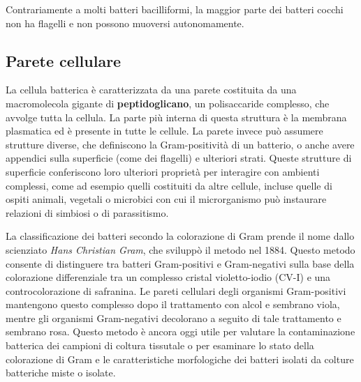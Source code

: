 \documentclass[../main.tex]{subfiles}
\begin{document}
Contrariamente a molti batteri bacilliformi, la maggior parte dei batteri cocchi non ha flagelli e non possono muoversi autonomamente.\cite{levinson_2018}

\subsection{Parete cellulare}

La cellula batterica è caratterizzata da una parete costituita da una macromolecola gigante di \textbf{peptidoglicano}, un polisaccaride complesso, che avvolge tutta la cellula. La parte più interna di questa struttura è la membrana plasmatica ed è presente in tutte le cellule. La parete invece può assumere strutture diverse, che definiscono la Gram-positività di un batterio, o anche avere appendici sulla superficie (come dei flagelli) e ulteriori strati. Queste strutture di superficie conferiscono loro ulteriori proprietà per interagire con ambienti complessi, come ad esempio quelli costituiti da altre cellule, incluse quelle di ospiti animali, vegetali o microbici con cui il microrganismo può instaurare relazioni di simbiosi o di parassitismo.\cite{smith_1977}

La classificazione dei batteri secondo la colorazione di Gram prende il nome dallo scienziato \textit{Hans Christian Gram}, che sviluppò il metodo nel 1884. Questo metodo consente di distinguere tra batteri Gram-positivi e Gram-negativi sulla base della colorazione differenziale tra un complesso cristal violetto-iodio (CV-I) e una controcolorazione di safranina. Le pareti cellulari degli organismi Gram-positivi mantengono questo complesso dopo il trattamento con alcol e sembrano viola, mentre gli organismi Gram-negativi decolorano a seguito di tale trattamento e sembrano rosa. Questo metodo è ancora oggi utile per valutare la contaminazione batterica dei campioni di coltura tissutale o per esaminare lo stato della colorazione di Gram e le caratteristiche morfologiche dei batteri isolati da colture batteriche miste o isolate.\cite{coico_2005}
\end{document}
